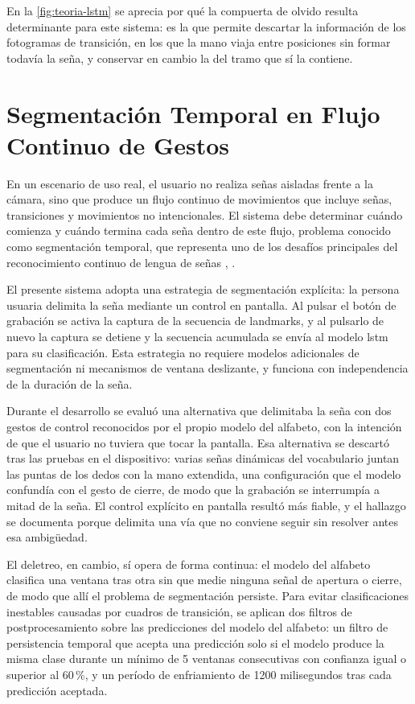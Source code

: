 En la \autoref{fig:teoria-lstm} se aprecia por qué la compuerta de olvido resulta
determinante para este
sistema: es la que permite descartar la información de los fotogramas de transición, en
los que la mano viaja entre posiciones sin formar todavía la seña, y conservar en cambio
la del tramo que sí la contiene.

\section{Segmentación Temporal en Flujo Continuo de Gestos}
\label{sec:segmentacion}

En un escenario de uso real, el usuario no realiza señas aisladas frente a la cámara,
sino que produce un flujo continuo de movimientos que incluye señas, transiciones y
movimientos no intencionales. El sistema debe determinar cuándo comienza y cuándo
termina cada seña dentro de este flujo, problema conocido como segmentación temporal,
que representa uno de los desafíos principales del reconocimiento continuo de lengua de
señas \cite{sadik_survey_2025}, \cite{srivastava_continuous_2024}.

El presente sistema adopta una estrategia de segmentación explícita: la persona usuaria
delimita la seña mediante un control en pantalla. Al pulsar el botón de grabación se
activa la captura de la secuencia de landmarks, y al pulsarlo de nuevo la captura se
detiene y la secuencia acumulada se envía al modelo \acrshort{lstm} para su clasificación.
Esta estrategia no requiere modelos adicionales de segmentación ni mecanismos de ventana
deslizante, y funciona con independencia de la duración de la seña.

Durante el desarrollo se evaluó una alternativa que delimitaba la seña con dos gestos de
control reconocidos por el propio modelo del alfabeto, con la intención de que el usuario
no tuviera que tocar la pantalla. Esa alternativa se descartó tras las pruebas en el
dispositivo: varias señas dinámicas del vocabulario juntan las puntas de los dedos con la
mano extendida, una configuración que el modelo confundía con el gesto de cierre, de modo
que la grabación se interrumpía a mitad de la seña. El control explícito en pantalla
resultó más fiable, y el hallazgo se documenta porque delimita una vía que no conviene
seguir sin resolver antes esa ambigüedad.

El deletreo, en cambio, sí opera de forma continua: el modelo del alfabeto clasifica una
ventana tras otra sin que medie ninguna señal de apertura o cierre, de modo que allí el
problema de segmentación persiste. Para evitar clasificaciones inestables causadas por
cuadros de transición, se aplican dos
filtros de postprocesamiento sobre las predicciones del modelo del alfabeto: un filtro de
persistencia temporal que acepta una predicción solo si el modelo produce la misma clase
durante un mínimo de 5 ventanas consecutivas con confianza igual o superior al 60\,\%, y
un período de enfriamiento de 1200 milisegundos tras cada predicción aceptada.

